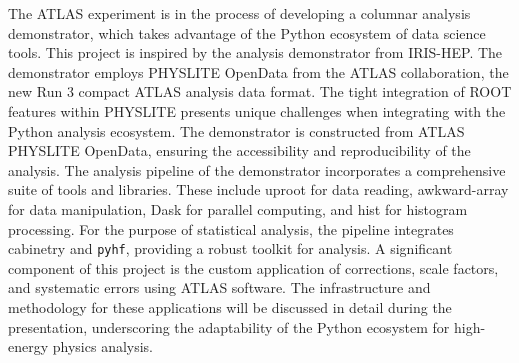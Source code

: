 The ATLAS experiment is in the process of developing a columnar analysis demonstrator, which takes advantage of the Python ecosystem of data science tools.
This project is inspired by the analysis demonstrator from IRIS-HEP.
The demonstrator employs PHYSLITE OpenData from the ATLAS collaboration, the new Run 3 compact ATLAS analysis data format.
The tight integration of ROOT features within PHYSLITE presents unique challenges when integrating with the Python analysis ecosystem.
The demonstrator is constructed from ATLAS PHYSLITE OpenData, ensuring the accessibility and reproducibility of the analysis.
The analysis pipeline of the demonstrator incorporates a comprehensive suite of tools and libraries.
These include uproot for data reading, awkward-array for data manipulation, Dask for parallel computing, and hist for histogram processing.
For the purpose of statistical analysis, the pipeline integrates cabinetry and \texttt{pyhf}, providing a robust toolkit for analysis.
A significant component of this project is the custom application of corrections, scale factors, and systematic errors using ATLAS software.
The infrastructure and methodology for these applications will be discussed in detail during the presentation, underscoring the adaptability of the Python ecosystem for high-energy physics analysis.
